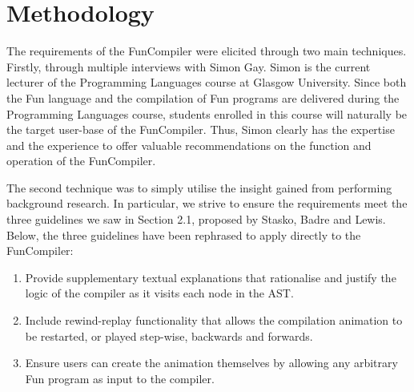 \documentclass{l4proj}
\begin{document}
\section{Methodology}
The requirements of the FunCompiler were elicited through two main techniques. Firstly, through multiple interviews with Simon Gay. Simon is the current lecturer of the Programming Languages course at Glasgow University. Since both the Fun language and the compilation of Fun programs are delivered during the Programming Languages course, students enrolled in this course will naturally be the target user-base of the FunCompiler. Thus, Simon clearly has the expertise and the experience to offer valuable recommendations on the function and operation of the FunCompiler.

The second technique was to simply utilise the insight gained from performing background research. In particular, we strive to ensure the requirements meet the three guidelines we saw in Section 2.1, proposed by Stasko, Badre and Lewis. Below, the three guidelines have been rephrased to apply directly to the FunCompiler:
\begin{enumerate}[label=Guideline \alph*)]
\item Provide supplementary textual explanations that rationalise and justify the logic of the compiler as it visits each node in the AST.
\item Include rewind-replay functionality that allows the compilation animation to be restarted, or played step-wise, backwards and forwards.
\item Ensure users can create the animation themselves by allowing any arbitrary Fun program as input to the compiler.
\end{enumerate}
\pagebreak
\end{document}
